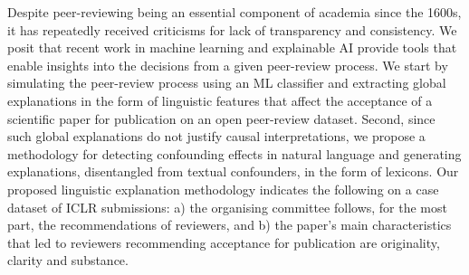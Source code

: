 Despite peer-reviewing being an essential component of academia since the 1600s, it has repeatedly received criticisms for lack of transparency and consistency. We posit that recent work in machine learning and explainable AI provide tools that enable insights into the decisions from a given peer-review process. We start by simulating the peer-review process using an ML classifier and extracting global explanations in the form of linguistic features that affect the acceptance of a scientific paper for publication on an open peer-review dataset. Second, since such global explanations do not justify causal interpretations, we propose a methodology for detecting confounding effects in natural language and generating explanations, disentangled from textual confounders, in the form of lexicons. Our proposed linguistic explanation methodology indicates the following on a case dataset of ICLR submissions: a) the organising committee follows, for the most part, the recommendations of reviewers, and b) the paper's main characteristics that led to reviewers recommending acceptance for publication are originality, clarity and substance.
